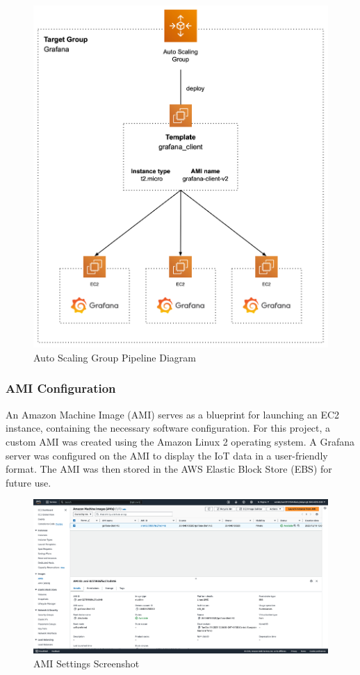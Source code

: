 \documentclass[12pt,oneside]{book} %
\begin{document}
\begin{figure}[H]
    \centering
    \includegraphics[width=1\linewidth]{images/grafana.png}
    \caption{Auto Scaling Group Pipeline Diagram}\label{fig:auto-scaling-group-pipeline}
\end{figure}

\newpage
\subsubsection{AMI Configuration}
An Amazon Machine Image (AMI) serves as a blueprint for launching an EC2
instance, containing the necessary software configuration. For this project, a
custom AMI was created using the Amazon Linux 2 operating system. A Grafana
server was configured on the AMI to display the IoT data in a user-friendly
format. The AMI was then stored in the AWS Elastic Block Store (EBS) for future
use.
\begin{figure}[H]
    \centering
    \includegraphics[width=1\linewidth]{images/ami.png}
    \caption{AMI Settings Screenshot}\label{fig:ami-settings}
\end{figure}
\end{document}
